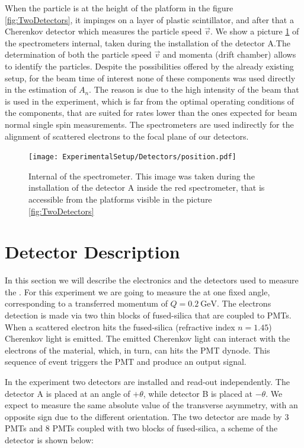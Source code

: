 When the particle is at the height of the platform in the figure \ref{fig:TwoDetectors}, it impinges on a layer of plastic scintillator, and after that a Cherenkov detector which measures the particle speed $\vec{v}$. We show a picture \ref{fig:internal} of the spectrometers internal, taken during the installation of the detector A.The determination of both the particle speed $\vec{v}$ and momenta (drift chamber) allows to identify the particles. Despite the possibilities offered by the already existing setup, for the beam time of interest none of these components was used directly in the estimation of $A_{n}$. The reason is due to the high intensity of the beam that is used in the experiment, which is far from the optimal operating conditions of the components, that are suited for rates lower than the ones expected for beam normal single spin measurements. The spectrometers are used indirectly for the alignment of scattered electrons to the focal plane of our detectors.

\begin{figure}
\centering
\caption{Internal of the spectrometer. This image was taken during the installation of the detector A inside the red spectrometer, that is accessible from the platforms visible in the picture \ref{fig:TwoDetectors}}
\texttt{[image: ExperimentalSetup/Detectors/position.pdf]}
\label{fig:internal}
\end{figure}


\newpage
\section{Detector Description} \label{detectors}
In this section we will describe the electronics and the detectors used to measure the \transv .
For this experiment we are going to measure the \transv at one fixed angle, corresponding to a transferred momentum of $Q = \SI{0.2}{\giga \electronvolt}$. The electrons detection is 
made via two thin blocks of fused-silica that are coupled to PMTs. When a scattered electron hits the fused-silica (refractive index $n = 1.45$) Cherenkov light is emitted. The emitted Cherenkov light can interact with the electrons of the material, which, in turn, can hits the PMT dynode. This sequence of event triggers the PMT and produce an output signal.

In the experiment two detectors are installed and read-out independently. The detector A is placed at an angle of $+\theta$, while detector B is placed at $-\theta$. We expect to measure the same absolute value of the transverse asymmetry, with an opposite sign due to the different orientation. 
The two detector are made by 3 PMTs and 8 PMTs coupled with two blocks of fused-silica, a scheme of the detector is shown below:

